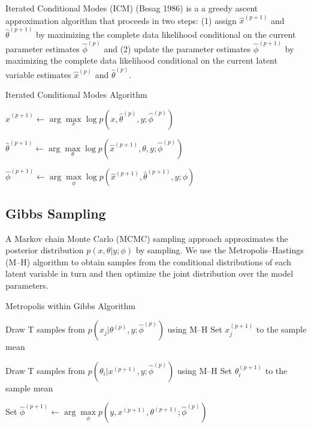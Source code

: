 \documentclass[11pt]{amsart}
\begin{document}
Iterated Conditional Modes (ICM) (Besag 1986) is a a greedy ascent approximation algorithm that proceeds in two steps: (1) assign $\hat{x}^{(p+1)}$ and $\hat{\theta}^{(p+1)}$ by maximizing the complete data likelihood conditional on the current parameter estimates $\hat{\phi}^{(p)}$ and (2) update the parameter estimates $\hat{\phi}^{(p+1 )}$ by maximizing the complete data likelihood conditional on the current latent variable estimates $\hat{x}^{(p)}$ and $\hat{\theta}^{(p)}$.
\begin{algorithm}
\caption{Iterated Conditional Modes Algorithm}
\label{alg:assign_update}
\begin{algorithmic}[1]

\REPEAT

\STATE $\hat{x}^{(p+1)} \leftarrow \arg \max\limits_x \log p\left( x, \hat{\theta}^{(p)}, y ; \hat{\phi}^{(p)} \right)$

\STATE $\hat{\theta}^{(p+1)} \leftarrow \arg \max\limits_\theta \log p\left( \hat{x}^{(p+1)}, \theta, y ; \hat{\phi}^{(p)} \right)$

\STATE $\hat{\phi}^{(p+1)} \leftarrow \arg \max\limits_\phi \log p\left( \hat{x}^{(p+1)}, \hat{\theta}^{(p+1)}, y ; \phi \right)$

\end{algorithmic}
\end{algorithm}

\subsection{Gibbs Sampling}
A Markov chain Monte Carlo (MCMC) sampling approach approximates the posterior distribution $p \left( x, \theta | y; \phi \right)$ by sampling. We use the Metropolis--Hastings (M--H) algorithm to obtain samples from the conditional distributions of each latent variable in turn and then optimize the joint distribution over the model parameters.

\begin{algorithm}[ht]
\caption{Metropolis within Gibbs Algorithm}
\label{alg:metro_gibbs}
\begin{algorithmic}[1]

\REPEAT
{}
	\STATE Draw T samples from $p \left( x_{j} | \theta^{(p)}, y; \hat{\phi}^{(p)} \right)$ using M--H
	\STATE Set $x_j^{(p+1)}$ to the sample mean
\ENDFOR

	\STATE Draw T samples from $p \left( \theta_i | x^{(p+1)}, y ; \hat{\phi}^{(p)} \right)$ using M--H
	\STATE Set $\theta_i^{(p+1)}$ to the sample mean
\ENDFOR

\STATE Set $\hat{\phi}^{(p+1)} \leftarrow \arg \max\limits_{\phi} p \left( y , x^{(p+1)}, \theta^{(p+1)}; \hat{\phi}^{(p)} \right)$

\end{algorithmic}
\end{algorithm}
\end{document}
